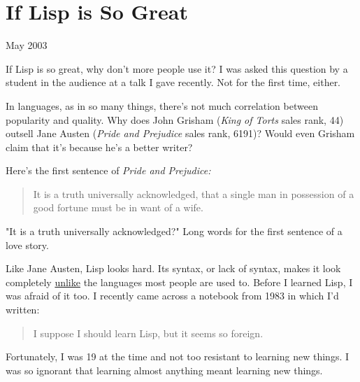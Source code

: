 \chapter{If Lisp is So Great}


            
              
                

May 2003

If Lisp is so great, why don't more
                  people use it? I was asked this question by a student in the
                  audience at a talk I gave recently. Not for the first time,
                  either.

In languages, as in so many things, there's
                  not much correlation between popularity and quality. Why does
                  John Grisham (\emph{King of Torts} sales rank, 44) outsell
                  Jane Austen (\emph{Pride and Prejudice} sales rank, 6191)?
                  Would even Grisham claim that it's because he's a better
                  writer?

Here's the first sentence of
                  \emph{Pride and Prejudice:}
                  \begin{quote}

                    It is a truth universally acknowledged, that a single man in
                    possession of a good fortune must be in want of a wife.
                  
\end{quote}

                  "It is a truth universally acknowledged?" Long words for the
                  first sentence of a love story.

Like Jane Austen,
                  Lisp looks hard. Its syntax, or lack of syntax, makes it look
                  completely
                  \href{https://sep.turbifycdn.com/ty/cdn/paulgraham/acl2.lisp?t=1688221954\&}{unlike}
                  the languages most people are used to. Before I learned Lisp,
                  I was afraid of it too. I recently came across a notebook from
                  1983 in which I'd written:
                  \begin{quote}

                    I suppose I should learn Lisp, but it seems so foreign.
                  
\end{quote}

                  Fortunately, I was 19 at the time and not too resistant to
                  learning new things. I was so ignorant that learning almost
                  anything meant learning new things.

